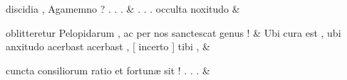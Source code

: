 \documentclass[12pt,onecolumn,twoside,a4paper]{memoir}
\begin{document}
\begin{pairs}
\begin{Leftside}
                              discidia
                              ,
                              Agamemno
                              ?
                              .
                              .
                              . \&
                         \stanza {}.
                              .
                              .
                              occulta
                              noxitudo & 
                     
                              oblitteretur
                              Pelopidarum
                              ,
                              ac
                              per
                              nos
                              sanctescat
                              genus
                              ! \&
                         \stanza {}Ubi
                              cura
                              est
                              ,
                              ubi
                              anxitudo
                              acerbast
                              {acerbast}
                              ,
                              [
                              incerto
                              ]
                              tibi
                              , & 
                     
                              cuncta
                              consiliorum
                              ratio
                              et
                              fortunæ
                              sit
                              !
                              .
                              .
                              . \&
                     
                  \endnumbering
		\end{Leftside}
                  \begin{Rightside}
			\beginnumbering
			\numberstanzafalse
                     

\end{Rightside}
\end{pairs}
\end{document}
